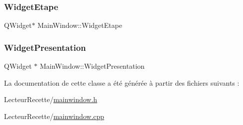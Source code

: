 \mbox{\label{class_main_window_a8463ff15a4d0c60daf94ef4555710e9b}} 
\subsubsection{\texorpdfstring{Widget\+Etape}{WidgetEtape}}
{\footnotesize\ttfamily Q\+Widget$\ast$ Main\+Window\+::\+Widget\+Etape\hspace{0.3cm}{\ttfamily [private]}}

\mbox{\label{class_main_window_af897497296009c9ed94c40d7785bb847}} 
\subsubsection{\texorpdfstring{Widget\+Presentation}{WidgetPresentation}}
{\footnotesize\ttfamily Q\+Widget $\ast$ Main\+Window\+::\+Widget\+Presentation\hspace{0.3cm}{\ttfamily [private]}}



La documentation de cette classe a été générée à partir des fichiers suivants \+:\begin{DoxyCompactItemize}
\item 
Lecteur\+Recette/\hyperlink{mainwindow_8h}{mainwindow.\+h}\item 
Lecteur\+Recette/\hyperlink{mainwindow_8cpp}{mainwindow.\+cpp}\end{DoxyCompactItemize}
